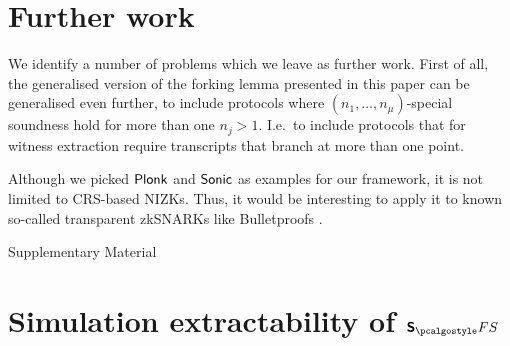 \let\accentvec\vec \documentclass[runningheads]{llncs}
\begin{document}
\section{Further work}
We identify a number of problems which we leave as further work. First of all,
the generalised version of the forking lemma presented in this paper can be
generalised even further, to include protocols where $(n_1, \ldots,
n_\mu)$-special soundness hold for more than one $n_j > 1$. I.e.~to include
protocols that for witness extraction require transcripts that branch at more
than one point.

Although we picked $\textnormal{\textsf{Plonk}}$ and ${\textnormal{\textsf{Sonic}}}$ as examples for our framework, it is
not limited to CRS-based NIZKs. Thus, it would be interesting to apply it to
known so-called transparent zkSNARKs like Bulletproofs \cite{SP:BBBPWM18}.



\clearpage
\appendix
{\Huge{Supplementary Material}}
\section{Simulation extractability of $\sonicprotfs$}
\end{document}

